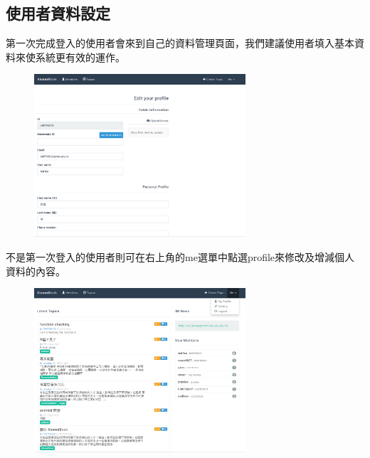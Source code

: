 \documentclass[12pt]{article}
\begin{document}
\subsection{使用者資料設定}
第一次完成登入的使用者會來到自己的資料管理頁面，我們建議使用者填入基本資料來使系統更有效的運作。
\begin{figure}[H]
\centering\includegraphics[width=0.7\textwidth]{img/profile01.png}
\end{figure}
不是第一次登入的使用者則可在右上角的me選單中點選profile來修改及增減個人資料的內容。
\begin{figure}[H]
\centering\includegraphics[width=0.7\textwidth]{img/profile02.png}
\end{figure}
\end{document}
